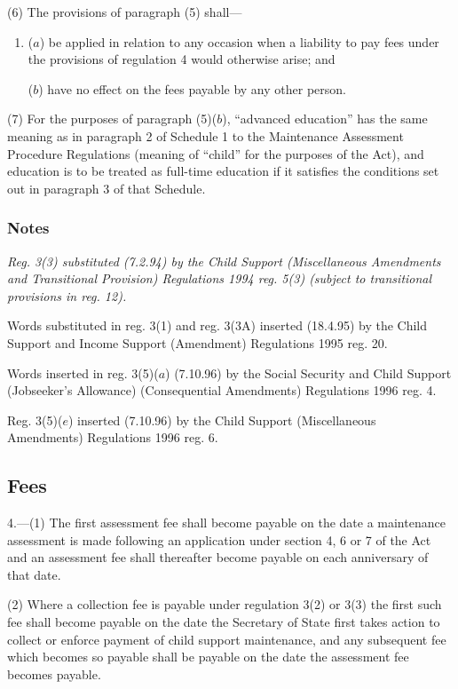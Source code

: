 \documentclass[a4paper]{article}
\newcommand\amendment[1]{\subsubsection*{Notes}{\itshape\frenchspacing\footnotesize #1 \par}}
\begin{document}
(6) The provisions of paragraph (5) shall—
\begin{enumerate}\item[]
($a$) be applied in relation to any occasion when a liability to pay fees under the provisions of regulation 4 would otherwise arise; and

($b$) have no effect on the fees payable by any other person.
\end{enumerate}

(7) For the purposes of paragraph (5)($b$), “advanced education” has the same meaning as in paragraph 2 of Schedule 1 to the Maintenance Assessment Procedure Regulations (meaning of “child” for the purposes of the Act), and education is to be treated as full-time education if it satisfies the conditions set out in paragraph 3 of that Schedule.

\amendment{
Reg. 3(3) substituted (7.2.94) by the Child Support (Miscellaneous Amendments and Transitional Provision) Regulations 1994 reg. 5(3) (subject to transitional provisions in reg. 12).

Words substituted in reg. 3(1) and reg. 3(3A) inserted (18.4.95) by the Child Support and Income Support (Amendment) Regulations 1995 reg. 20.

Words inserted in reg. 3(5)($a$) (7.10.96) by the Social Security and Child Support (Jobseeker's Allowance) (Consequential Amendments) Regulations 1996 reg. 4.

Reg. 3(5)($e$) inserted (7.10.96) by the Child Support (Miscellaneous Amendments) Regulations 1996 reg. 6.
}

\subsection[4. Fees]{Fees}

4.—(1) The first assessment fee shall become payable on the date a maintenance assessment is made following an application under section 4, 6 or 7 of the Act and an assessment fee shall thereafter become payable on each anniversary of that date.


(2) Where a collection fee is payable under regulation 3(2) or 3(3) the first such fee shall become payable on the date the Secretary of State first takes action to collect or enforce payment of child support maintenance, and any subsequent fee which becomes so payable shall be payable on the date the assessment fee becomes payable.
\end{document}
